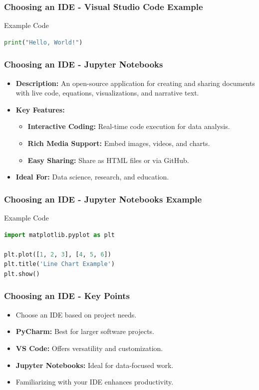 \documentclass{beamer}
\begin{document}
\begin{frame}[fragile]
    \frametitle{Choosing an IDE - Visual Studio Code Example}
    \begin{block}{Example Code}
    \begin{lstlisting}[language=Python]
print("Hello, World!")
    \end{lstlisting}
    \end{block}
\end{frame}

\begin{frame}[fragile]
    \frametitle{Choosing an IDE - Jupyter Notebooks}
    \begin{itemize}
        \item \textbf{Description:} An open-source application for creating and sharing documents with live code, equations, visualizations, and narrative text.
        \item \textbf{Key Features:}
        \begin{itemize}
            \item \textbf{Interactive Coding:} Real-time code execution for data analysis.
            \item \textbf{Rich Media Support:} Embed images, videos, and charts.
            \item \textbf{Easy Sharing:} Share as HTML files or via GitHub.
        \end{itemize}
        \item \textbf{Ideal For:} Data science, research, and education.
    \end{itemize}
\end{frame}

\begin{frame}[fragile]
    \frametitle{Choosing an IDE - Jupyter Notebooks Example}
    \begin{block}{Example Code}
    \begin{lstlisting}[language=Python]
import matplotlib.pyplot as plt

plt.plot([1, 2, 3], [4, 5, 6])
plt.title('Line Chart Example')
plt.show()
    \end{lstlisting}
    \end{block}
\end{frame}

\begin{frame}[fragile]
    \frametitle{Choosing an IDE - Key Points}
    \begin{itemize}
        \item Choose an IDE based on project needs.
        \item \textbf{PyCharm:} Best for larger software projects.
        \item \textbf{VS Code:} Offers versatility and customization.
        \item \textbf{Jupyter Notebooks:} Ideal for data-focused work.
        \item Familiarizing with your IDE enhances productivity.
    \end{itemize}
\end{frame}
\end{document}
